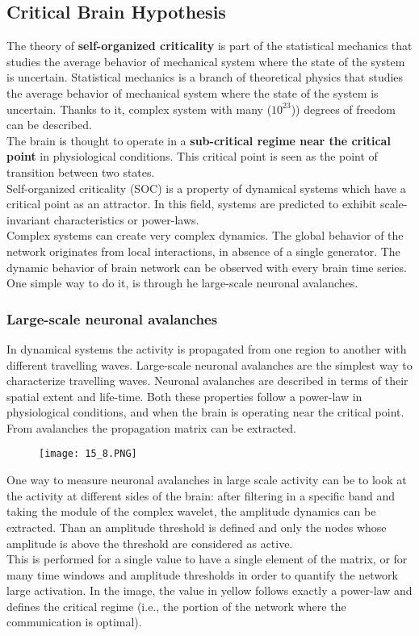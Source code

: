 \subsection{Critical Brain Hypothesis}
The theory of \textbf{self-organized criticality} is part of the statistical mechanics that studies the average behavior of mechanical system where the state of the system is uncertain. Statistical mechanics is a branch of theoretical physics that studies the average behavior of mechanical system where the state of the system is uncertain. Thanks to it, complex system with many (\(10^{23}\))) degrees of freedom can be described.\\
The brain is thought to operate in a \textbf{sub-critical regime near the critical point} in physiological conditions. This critical point is seen as the point of transition between two states.\\
Self-organized criticality (SOC) is a property of dynamical systems which have a critical point as an attractor. In this field, systems are predicted to exhibit scale-invariant characteristics or power-laws.\\
Complex systems can create very complex dynamics. The global behavior of the network originates from local interactions, in absence of a single generator. The dynamic behavior of brain network can be observed with every brain time series. One simple way to do it, is through he large-scale neuronal avalanches.
\subsubsection{Large-scale neuronal avalanches}
In dynamical systems the activity is propagated from one region to another with different travelling waves. Large-scale neuronal avalanches are the simplest way to characterize travelling waves. Neuronal avalanches are described in terms of their spatial extent and life-time. Both these properties follow a power-law in physiological conditions, and when the brain is operating near the critical point. From avalanches the propagation matrix can be extracted.
\begin{figure}[H]
    \centering
    \texttt{[image: 15\_8.PNG]}
\end{figure}
One way to measure neuronal avalanches in large scale activity can be to look at the activity at different sides of the brain: after filtering in a specific band and taking the module of the complex wavelet, the amplitude dynamics can be extracted. Than an amplitude threshold is defined and only the nodes whose amplitude is above the threshold are considered as active.\\
This is performed for a single value to have a single element of the matrix, or for many time windows and amplitude thresholds in order to quantify the network large activation. In the image, the value in yellow follows exactly a power-law and defines the critical regime (i.e., the portion of the network where the communication is optimal).
